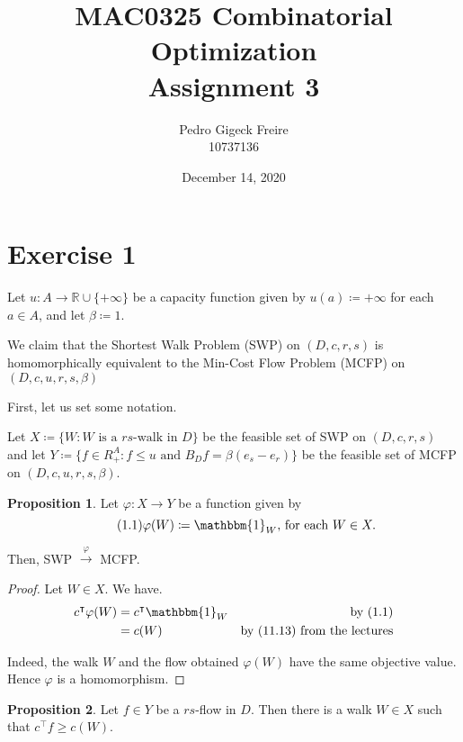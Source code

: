 \documentclass[a4paper,10pt, leqno]{article}
\title{MAC0325 Combinatorial Optimization \\
        \large Assignment 3 }
\author{Pedro Gigeck Freire \\
        10737136}
\date{December 14, 2020}
\theoremstyle{definition}
\begin{document}
\maketitle

\section*{Exercise 1}

Let $u : A \to \mathbb{R} \cup \{+\infty\}$ be a capacity function given by $u(a) \coloneqq +\infty$ for each $a \in A$, and let $
\beta \coloneqq 1$.

We claim that the Shortest Walk Problem (SWP) on $(D, c, r, s)$ is homomorphically equivalent to the Min-Cost Flow Problem (MCFP) on $(D, c, u, r, s, \beta)$

First, let us set some notation.

Let $X \coloneqq \{ W : W \text{ is a } rs\text{-walk in } D \}$ be the feasible set of SWP on $(D, c, r, s)$ and let $Y \coloneqq \{ f \in R_+^A : f \leq u \text{ and } B_Df = \beta(e_s - e_r)\}$ be the feasible set of MCFP on $(D, c, u, r, s, \beta)$.
 
\newtheorem{proposition}{Proposition}
\begin{proposition}
    Let $\varphi : X \to Y$ be a function given by 
    \begin{equation*}
        \tag{1.1} \varphi(W) \coloneqq \mathbbm{1}_W \text{, for each } W \in X.
    \end{equation*}
    
Then, SWP $\xrightarrow{\varphi}$ MCFP. 
\end{proposition}
\begin{proof}
Let $W \in X$. We have.
\begin{align*}
 c^{\intercal}\varphi(W) &= c^{\intercal}\mathbbm{1}_W &\text{by (1.1)} \\
 &= c(W) &\text{by (11.13) from the lectures}\\
\end{align*}

Indeed, the walk $W$ and the flow obtained $\varphi(W)$ have the same objective value. Hence $\varphi$ is a homomorphism.
\end{proof}


\begin{proposition}
 Let $f \in Y$ be a $rs$-flow in $D$. Then there is a walk $W \in X$ such that $c^{\intercal}f \geq c(W)$.  
\end{proposition}
\end{document}
